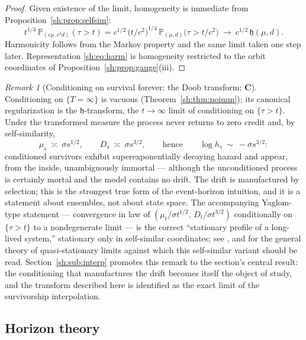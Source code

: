 \documentclass[11pt]{article}
\numberwithin{equation}{section}
\theoremstyle{plain}
\theoremstyle{definition}
\theoremstyle{remark}
\newtheorem{remark}[theorem]{Remark}
\newcommand{\PP}{\mathbb{P}}
\newcommand{\hm}{\mathfrak{h}}
\begin{document}
\begin{proof}
Given existence of the limit, homogeneity is immediate from
Proposition~\ref{sh:prop:selfsim}:
\[
t^{1/4}\,\PP_{(c\mu,c^3d)}(\tau>t)
= c^{1/2}\,\bigl(t/c^2\bigr)^{1/4}\,\PP_{(\mu,d)}\bigl(\tau>t/c^{2}\bigr)
\ \longrightarrow\ c^{1/2}\,\hm(\mu,d).
\]
Harmonicity follows from the Markov property and the same limit taken one
step later. Representation \eqref{sh:eq:harm} is homogeneity restricted to
the orbit coordinates of Proposition~\ref{sh:prop:gauge}(iii).
\end{proof}

\begin{remark}[Conditioning on survival forever: the Doob transform;
\textbf{C}]\label{sh:rem:doob}
Conditioning on $\{T=\infty\}$ is vacuous (Theorem~\ref{sh:thm:noimm});
its canonical regularization is the $\hm$-transform, the
$t\to\infty$ limit of conditioning on $\{\tau>t\}$. Under the transformed
measure the process never returns to zero credit and, by self-similarity,
\[
\mu_s\ \asymp\ \sigma s^{1/2},\qquad D_s\ \asymp\ \sigma s^{3/2},
\qquad\text{hence}\qquad \log h_s\ \sim\ -\sigma s^{3/2}:
\]
conditioned survivors exhibit superexponentially decaying hazard and
appear, from the inside, unambiguously immortal --- although the
unconditioned process is certainly mortal and the model contains no drift.
The drift is manufactured by selection; this is the strongest true form of
the event-horizon intuition, and it is a statement about ensembles, not
about state space. The accompanying Yaglom-type statement --- convergence
in law of $(\mu_t/\sigma t^{1/2},\,D_t/\sigma t^{3/2})$ conditionally on
$\{\tau>t\}$ to a nondegenerate limit --- is the correct
``stationary profile of a long-lived system,'' stationary only in
self-similar coordinates; see \cite{GJW99,AS15}, and \cite{MV12} for
the general theory of quasi-stationary limits against which this
self-similar variant should be read.
Section~\ref{sh:sub:interp} promotes this remark to the section's central
result: the conditioning that manufactures the drift becomes itself the
object of study, and the transform described here is identified as the
exact limit of the survivorship interpolation.
\end{remark}

\subsection{Horizon theory}\label{sh:sub:horizon}
\end{document}

